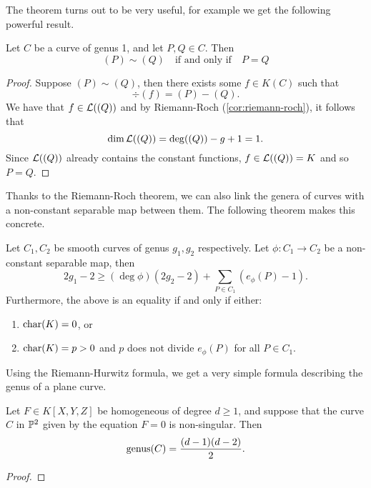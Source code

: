 The theorem turns out to be very useful, for example we get the following 
powerful result.
\begin{proposition}
	\label{prop:sim-implies-eq}
	Let $C$ be a curve of genus 1, and let $P, Q \in C$. Then
	\begin{equation*}
		(P) \sim (Q)
		\quad\textrm{if and only if}\quad
		P = Q
	\end{equation*}
\end{proposition}

\begin{proof}
	Suppose $(P) \sim (Q)$, then there exists some $f \in K(C)$ such that
	\begin{equation*}
		\div(f) = (P) - (Q).
	\end{equation*}
	We have that $f \in \mathcal{L}((Q))$ and by Riemann-Roch (\ref{cor:riemann-roch}),
	it follows that
	\begin{equation*}
		\dim \mathcal{L}((Q)) = \deg((Q)) - g + 1 = 1.
	\end{equation*}
	Since $\mathcal{L}((Q))$ already contains the constant functions, $f \in \mathcal{L}((Q)) = K$
	and so $P = Q$.
\end{proof}

Thanks to the Riemann-Roch theorem, we can also link the genera of 
curves with a non-constant separable map between them.
The following theorem makes this concrete.
\begin{theorem}
	Let $C_1, C_2$ be smooth curves of genus $g_1, g_2$ respectively.
	Let $\phi: C_1 \to C_2$ be a non-constant separable map, then
	\begin{equation*}
		2g_1 - 2 \geq (\deg \phi) (2g_2 - 2) + \sum_{P \in C_1}(e_\phi(P) - 1).
	\end{equation*}
	Furthermore, the above is an equality if and only if either:
	\begin{enumerate}[itemsep=0em, label=(\roman*)]
		\item $\operatorname{char}(K) = 0$, or
		\item $\operatorname{char}(K) = p > 0$ and $p$ does not divide $e_\phi(P)$ for all
			$P \in C_1$.
	\end{enumerate}
\end{theorem}

Using the Riemann-Hurwitz formula, we get a very simple formula describing
the genus of a plane curve.
\begin{corollary}
	\label{cor:genus-formula}
	Let $F \in K[X, Y, Z]$ be homogeneous of degree $d \geq 1$, and suppose that
	the curve $C$ in $\mathbb{P}^2$ given by the equation $F = 0$ is non-singular.
	Then
	\begin{equation*}
		\operatorname{genus}(C) = \frac{(d-1)(d-2)}{2}.
	\end{equation*}
\end{corollary}

\begin{proof}
\end{proof}



